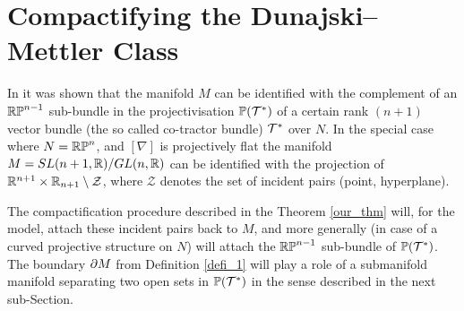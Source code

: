 

\section{Compactifying the Dunajski--Mettler Class} 
\label{section_4}
\newcommand{\ol}[1]{\overline{#1}} \newcommand{\bp}{\boldsymbol{p}}

In \cite{DM} it was shown that the manifold $M$ can be identified with the
complement of
an $\mathbb{RP}^{n-1}$ sub-bundle in the  projectivisation $\mathbb{P}(\mathcal{T}^*)$ of a certain rank $(n+1)$ vector bundle (the so called co-tractor bundle) $\mathcal{T}^*$  
over $N$. In the special case where $N=\mathbb{RP}^n$, and $[\nabla]$ is projectively 
flat the manifold $M=SL(n+1, \mathbb{R})/GL(n, \mathbb{R})$ can be identified with the projection of $\mathbb{R}^{n+1}\times \mathbb{R}_{n+1}\setminus {\mathcal Z}$, where ${\mathcal Z}$ denotes the set
of incident pairs (point, hyperplane).

The compactification procedure described in  
the Theorem \ref{our_thm} will, for the model, attach these incident pairs back to $M$, 
and more generally
(in case of a curved projective structure on $N$) will attach
the  $\mathbb{RP}^{n-1}$ sub-bundle of $\mathbb{P}(\mathcal{T}^*)$. The boundary $\partial M$ 
from Definition \ref{defi_1} will play a role of a submanifold manifold
separating two open sets in $\mathbb{P}(\mathcal{T}^*)$ in the sense described 
in the next sub-Section.

